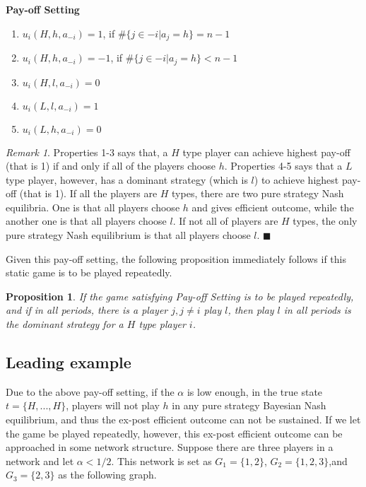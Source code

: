 \documentclass[12pt,letter]{article}
\newtheorem{proposition}{Proposition}[section]
\theoremstyle{remark}
\theoremstyle{remark}
\newtheorem*{remark}{Remark}
\theoremstyle{claim}
\begin{document}
\noindent\textbf{Pay-off Setting}

\begin{enumerate}
\item $u_i(H,h,a_{-i})=1$, if $\#\{j\in -i|a_j=h\}=n-1$
\item $u_i(H,h,a_{-i})=-1$, if $\#\{j\in -i|a_j=h\}<n-1$
\item $u_i(H,l,a_{-i})=0$
\item $u_i(L,l,a_{-i})=1$
\item $u_i(L,h,a_{-i})=0$
\end{enumerate}

\begin{remark}
Properties 1-3 says that, a $H$ type player can achieve highest pay-off (that is 1) if and only if all of the players choose $h$. Properties 4-5 says that a $L$ type player, however, has a dominant strategy (which is $l$) to achieve highest pay-off (that is 1). If all the players are $H$ types, there are two pure strategy Nash equilibria. One is that all players choose $h$ and gives efficient outcome, while the another one is that all players choose $l$. If not all of players are $H$ types, the only pure strategy Nash equilibrium is that all players choose $l$. $\blacksquare$
\end{remark} 

Given this pay-off setting, the following proposition immediately follows if this static game is to be played repeatedly.


\begin{proposition}
\label{prop:domi}
If the game satisfying Pay-off Setting is to be played repeatedly, and if in all periods, there is a player $j,j\neq i$ play $l$, then play $l$ in all periods is the dominant strategy for a $H$ type player $i$.
\end{proposition}



\subsection{Leading example}
Due to the above pay-off setting, if the $\alpha$ is low enough, in the true state $t=\{H,...,H\}$, players will not play $h$ in any pure strategy Bayesian Nash equilibrium, and thus the ex-post efficient outcome can not be sustained. If we let the game be played repeatedly, however, this ex-post efficient outcome can be approached in some network structure. Suppose there are three players in a network and let $\alpha<1/2$.  This network is set as $G_1=\{1,2\}$, $G_2=\{1,2,3\}$,and $G_3=\{2,3\}$ as the following graph.
\end{document}
